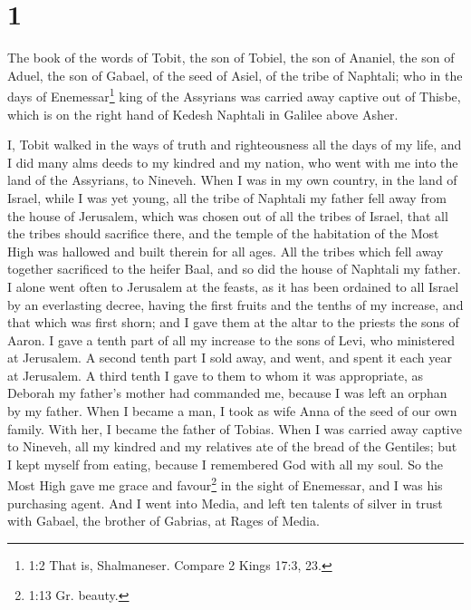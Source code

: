 \hypertarget{section}{%
\section{1}\label{section}}

 The book of the words of Tobit, the son of Tobiel, the son
of Ananiel, the son of Aduel, the son of Gabael, of the seed of Asiel,
of the tribe of Naphtali;  who in the days of
Enemessar\footnote{1:2 That is, Shalmaneser. Compare 2 Kings 17:3, 23.}
king of the Assyrians was carried away captive out of Thisbe, which is
on the right hand of Kedesh Naphtali in Galilee above Asher.

 I, Tobit walked in the ways of truth and righteousness all
the days of my life, and I did many alms deeds to my kindred and my
nation, who went with me into the land of the Assyrians, to Nineveh.
 When I was in my own country, in the land of Israel, while
I was yet young, all the tribe of Naphtali my father fell away from the
house of Jerusalem, which was chosen out of all the tribes of Israel,
that all the tribes should sacrifice there, and the temple of the
habitation of the Most High was hallowed and built therein for all ages.
 All the tribes which fell away together sacrificed to the
heifer Baal, and so did the house of Naphtali my father.  I
alone went often to Jerusalem at the feasts, as it has been ordained to
all Israel by an everlasting decree, having the first fruits and the
tenths of my increase, and that which was first shorn; and I gave them
at the altar to the priests the sons of Aaron.  I gave a
tenth part of all my increase to the sons of Levi, who ministered at
Jerusalem. A second tenth part I sold away, and went, and spent it each
year at Jerusalem.  A third tenth I gave to them to whom it
was appropriate, as Deborah my father's mother had commanded me, because
I was left an orphan by my father.  When I became a man, I
took as wife Anna of the seed of our own family. With her, I became the
father of Tobias.  When I was carried away captive to
Nineveh, all my kindred and my relatives ate of the bread of the
Gentiles;  but I kept myself from eating, 
because I remembered God with all my soul.  So the Most
High gave me grace and favour\footnote{1:13 Gr. beauty.} in the sight of
Enemessar, and I was his purchasing agent.  And I went into
Media, and left ten talents of silver in trust with Gabael, the brother
of Gabrias, at Rages of Media.

